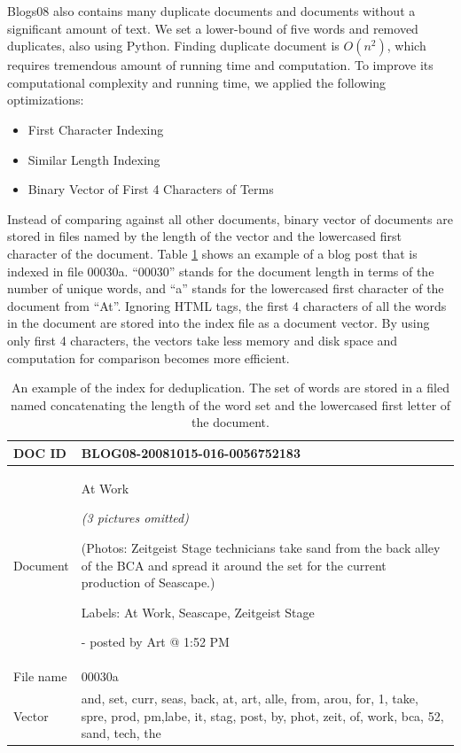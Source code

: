 \documentclass{sig-alternate}
\begin{document}
Blogs08 also contains many duplicate documents and documents without a significant amount of text. We set a lower-bound of five words and removed duplicates, also using Python. Finding duplicate document is $O(n^2)$, which requires tremendous amount of running time and computation. To improve its computational complexity and running time, we applied the following optimizations:

\begin{itemize}
\item First Character Indexing
\item Similar Length Indexing
\item Binary Vector of First 4 Characters of Terms
\end{itemize}

Instead of comparing against all other documents, binary vector of documents are stored in files named by the length of the vector and the lowercased first character of the document. Table \ref{table:dedup} shows an example of a blog post that is indexed in file 00030a. ``00030'' stands for the document length in terms of the number of unique words, and ``a'' stands for the lowercased first character of the document from ``At''. Ignoring HTML tags, the first 4 characters of all the words in the document are stored into the index file as a document vector. By using only first 4 characters, the vectors take less memory and disk space and computation for comparison becomes more efficient.


\begin{table}[h!t!]
\begin{center}
\begin{tabular}{l|p{6.0cm}}

\hline
DOC ID & BLOG08-20081015-016-0056752183\\ 

\hline
Document & 

At Work


\emph{(3 pictures omitted)}



(Photos: Zeitgeist Stage technicians take sand from the back alley of the BCA and spread it around the set for the current production of Seascape.)

Labels: At Work, Seascape, Zeitgeist Stage


- posted by Art @ 1:52 PM\\
\hline
File name& 00030a\\
\hline
Vector & and, set, curr, seas, back, at, art, alle, from, arou, for, 1, take, spre, prod, pm,labe, it, stag, post, by, phot, zeit, of, work, bca, 52, sand, tech, the\\

\hline
\end{tabular}
\caption{An example of the index for deduplication. The set of words are stored in a filed named concatenating the length of the word set and the lowercased first letter of the document.}
\label{table:dedup}
\end{center}
\end{table}
\end{document}
